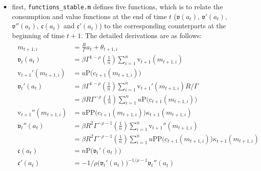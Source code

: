 \documentclass[titlepage,abstract]{\econtex}
\begin{document}
\begin{itemize}
     \item first, \texttt{functions\_stable.m} defines five functions, which is to relate the consumption and value functions at the end of time $t$ ($\ensuremath{\mathfrak{v}}(a_{t})$, $\ensuremath{\mathfrak{v}}'(a_{t})$,
            $\ensuremath{\mathfrak{v}}''(a_{t})$, $\ensuremath{\mathfrak{c}}(a_{t})$ and $\ensuremath{\mathfrak{c}}'(a_{t})$) to the corresponding counterparts at the beginning of time $t+1$. The detailed derivations are as follows:
            \begin{equation}\begin{gathered}\begin{aligned}
            m_{t+1, i}  & =  \frac{R}{\Gamma} {a}_{t} + \theta_{t+1, i} \\
            \ensuremath{\mathfrak{v}}_{t}(a_{t})  & = \beta \Gamma^{1-\rho} \left(\frac{1}{n}\right)\sum_{i=1}^{n} \ensuremath{\mathrm{v}}_{t+1}(m_{t+1, i}) \\
            \ensuremath{\mathrm{v}}_{t+1}'(m_{t+1, i})  & =  u\text{P}(\ensuremath{\mathrm{c}}_{t+1}(m_{t+1, i})\big) \\
            \ensuremath{\mathfrak{v}}_{t}'(a_{t})  & = \beta \Gamma^{1-\rho} \left(\frac{1}{n}\right)\sum_{i=1}^{n} \ensuremath{\mathrm{v}}_{t+1}'(m_{t+1, i}) R/\Gamma\\
             & =  \beta R \Gamma^{-\rho} \left(\frac{1}{n}\right)\sum_{i=1}^{n}
            u\text{P}(\ensuremath{\mathrm{c}}_{t+1}(m_{t+1, i})\big) \\
            \ensuremath{\mathrm{v}}_{t+1}''(m_{t+1, i})  & =  u\text{PP}\big(\ensuremath{\mathrm{c}}_{t+1}(m_{t+1, i})\big) \kappa_{t+1}(m_{t+1, i}) \\
            \ensuremath{\mathfrak{v}}_{t}''(a_{t})  & = \beta R^{2} \Gamma^{-\rho-1} \left(\frac{1}{n}\right)\sum_{i=1}^{n} \ensuremath{\mathrm{v}}_{t+1}''(m_{t+1, i}) \\
             & =  \beta R^{2} \Gamma^{-\rho-1} \left(\frac{1}{n}\right)\sum_{i=1}^{n}
              u\text{PP}\big(\ensuremath{\mathrm{c}}_{t+1}(m_{t+1, i})\big) \ensuremath{\kappa}_{t+1}(m_{t+1, i}) \\
              \ensuremath{\mathfrak{c}}(a_{t})  & =  n\text{P}\big(\ensuremath{\mathfrak{v}}_{t}'(a_{t})\big) \\
              \ensuremath{\mathfrak{c}}'(a_{t})  & = -1/\rho \big(\ensuremath{\mathfrak{v}}_{t}'(a_{t})\big)^{-1/\rho-1} \ensuremath{\mathfrak{v}}_{t}''(a_{t}) \\

\end{aligned}
\end{gathered}
\end{equation}
\end{itemize}
\end{document}
